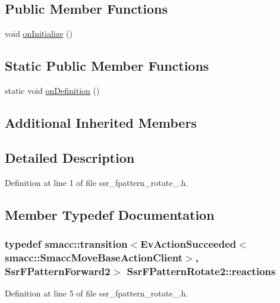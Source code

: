 \subsection*{Public Member Functions}
\begin{DoxyCompactItemize}
\item 
void \hyperlink{structSsrFPatternRotate2_af062537a9565259e197c1241c9c9d9b0}{on\+Initialize} ()
\end{DoxyCompactItemize}
\subsection*{Static Public Member Functions}
\begin{DoxyCompactItemize}
\item 
static void \hyperlink{structSsrFPatternRotate2_a4140f75a6189da0833fd5e6100c5193d}{on\+Definition} ()
\end{DoxyCompactItemize}
\subsection*{Additional Inherited Members}


\subsection{Detailed Description}


Definition at line 1 of file ssr\+\_\+fpattern\+\_\+rotate\+\_.\+h.



\subsection{Member Typedef Documentation}
\subsubsection[{\texorpdfstring{reactions}{reactions}}]{\setlength{\rightskip}{0pt plus 5cm}typedef {\bf smacc\+::transition}$<$Ev\+Action\+Succeeded$<${\bf smacc\+::\+Smacc\+Move\+Base\+Action\+Client}$>$, {\bf Ssr\+F\+Pattern\+Forward2}$>$ {\bf Ssr\+F\+Pattern\+Rotate2\+::reactions}}\hypertarget{structSsrFPatternRotate2_a3445f798fb3d6c6f2b468aefc7cf9ecb}{}\label{structSsrFPatternRotate2_a3445f798fb3d6c6f2b468aefc7cf9ecb}


Definition at line 5 of file ssr\+\_\+fpattern\+\_\+rotate\+\_.\+h.



